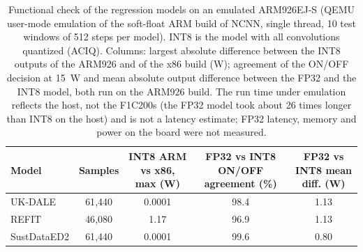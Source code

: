 \begin{table}[H]
\centering
\caption{Functional check of the regression models on an emulated ARM926EJ-S (QEMU user-mode emulation of the soft-float ARM build of NCNN, single thread, 10 test windows of 512 steps per model). INT8 is the model with all convolutions quantized (ACIQ). Columns: largest absolute difference between the INT8 outputs of the ARM926 and of the x86 build (W); agreement of the ON/OFF decision at 15~W and mean absolute output difference between the FP32 and the INT8 model, both run on the ARM926 build. The run time under emulation reflects the host, not the F1C200s (the FP32 model took about 26 times longer than INT8 on the host) and is not a latency estimate; FP32 latency, memory and power on the board were not measured.}
\label{tab:arm_emulation}
\footnotesize
\begin{tabular}{@{}lcccc@{}}
\toprule
Model & Samples & INT8 ARM vs x86, max (W) & FP32 vs INT8 ON/OFF agreement (\%) & FP32 vs INT8 mean diff. (W) \\
\midrule
UK-DALE & 61{,}440 & 0.0001 & 98.4 & 1.13 \\
REFIT & 46{,}080 & 1.17 & 96.9 & 1.13 \\
SustDataED2 & 61{,}440 & 0.0001 & 99.6 & 0.80 \\
\bottomrule
\end{tabular}
\end{table}
